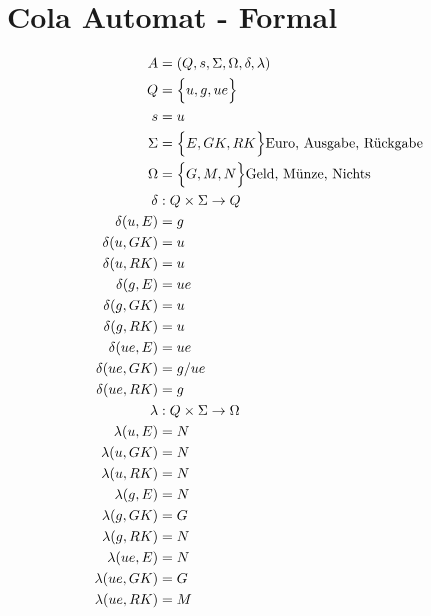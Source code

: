 \documentclass[12pt,a4paper]{report}
\begin{document}
	\section{Cola Automat - Formal}
	\begin{align*}
		A &= (Q,s,\Sigma, \Omega, \delta, \lambda) \\
		Q &= \Bigl\{u, g, ue\Bigl\} \\
		s &= u \\
		\Sigma &= \Bigl\{E, GK, RK\Bigl\} \text{Euro, Ausgabe, Rückgabe}\\
		\Omega &= \Bigl\{G, M, N\Bigl\} \text{Geld, Münze, Nichts} \\
		\delta &: Q \times \Sigma \to Q \\
		\delta(u,E) &= g \\
		\delta(u,GK) &= u\\
		\delta(u,RK) &= u\\
		\delta(g,E) &= ue\\
		\delta(g,GK) &= u\\
		\delta(g,RK) &= u \\
		\delta(ue,E) &= ue\\
		\delta(ue,GK) &= g / ue\\
		\delta(ue,RK) &= g\\
		\lambda &: Q \times \Sigma \to \Omega \\
		\lambda(u,E) &= N \\
		\lambda(u,GK) &= N \\
		\lambda(u,RK) &= N \\
		\lambda(g,E) &= N \\
		\lambda(g,GK) &= G \\
		\lambda(g,RK) &= N \\
		\lambda(ue,E) &= N \\
		\lambda(ue,GK) &= G \\
		\lambda(ue,RK) &= M
	\end{align*}
\end{document}
